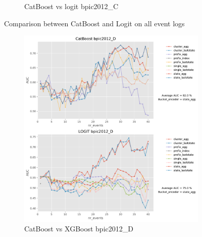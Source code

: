 \documentclass[twoside,11pt]{Latex/Classes/PhDthesisPSnPDF}
\begin{document}
\begin{figure}[t!]
\begin{subfigure}{0.48\textwidth}
		\caption{CatBoost vs logit bpic2012\_C} \label{fig:b12ccl}
	\end{subfigure}
	\caption{Comparison between CatBoost and Logit on all event logs}
\label{fig:r1cl}
\end{figure}



\begin{figure}[t!] %
	
	\begin{subfigure}{0.48\textwidth}
		\includegraphics[width=\linewidth]{images/catboost/graphslogit/bpic2012_D_CatBoost_logit.pdf}
		\caption{CatBoost vs XGBoost bpic2012\_D} \label{fig:b12dcl}
	\end{subfigure}\hspace*{\fill}
	\begin{subfigure}{0.48\textwidth}

\end{subfigure}
\end{figure}
\end{document}

